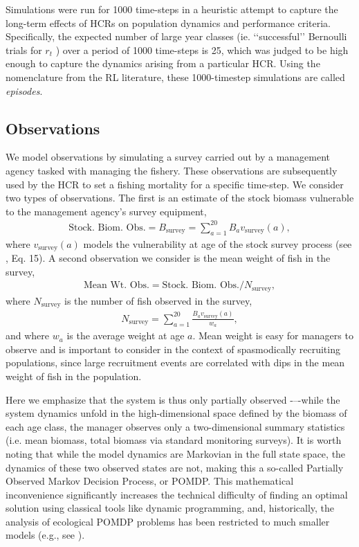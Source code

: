 \documentclass[floatfix,nofootinbib,longbibliography,notitlepage]{revtex4-1}
\def\bsurv{B_{\text{survey}}}
\def\vsurv{v_{\text{survey}}}
\def\nsurv{N_{\text{survey}}}
\begin{document}
Simulations were run for 1000 time-steps in a heuristic attempt to capture the long-term effects of HCRs on population dynamics and performance criteria. 
Specifically, the expected number of large year classes (ie. ‘‘successful’’ Bernoulli trials for $r_t$ ) over a period of 1000 time-steps is 25, which was judged to be high enough to capture the dynamics arising from a particular HCR. 
Using the nomenclature from the RL literature, these 1000-timestep simulations are called \emph{episodes}.

\subsection{Observations}

We model observations by simulating a survey carried out by a management agency tasked with managing the fishery. 
These observations are subsequently used by the HCR to set a fishing mortality for a specific  time-step. 
We consider two types of observations. 
The first is an estimate of the stock biomass vulnerable to the management agency’s survey equipment,
\begin{align}
    \text{Stock. Biom. Obs.} = \bsurv = \sum_{a=1}^{20} B_a \vsurv(a),
\end{align}
where $\vsurv(a)$ models the vulnerability at age of the stock survey process (see \cite{cahill2022}, Eq. 15). 
A second observation we consider is the mean weight of fish in the survey,
\begin{align}
    \text{Mean Wt. Obs.} = \text{Stock. Biom. Obs.} / \nsurv,
\end{align}
where $\nsurv$ is the number of fish observed in the survey,
\begin{align}
    \nsurv = \sum_{a=1}^{20} \frac{B_a \vsurv(a)}{w_a},
\end{align}
and where $w_a$ is the average weight at age $a$.
Mean weight is easy for managers to observe and is important to consider in the context of spasmodically recruiting populations, since large recruitment events are correlated with dips in the mean weight of fish in the population.

Here we emphasize that the system is thus only partially observed \cite{memarzadeh2019}-–-while the system dynamics unfold in the high-dimensional space defined by the biomass of each age class, the manager observes only a two-dimensional summary statistics (i.e. mean biomass, total biomass via standard monitoring surveys). 
It is worth noting that while the model dynamics are Markovian in the full state space, the dynamics of these two observed states are not, making this a so-called Partially Observed Markov Decision Process, or POMDP.  
This mathematical inconvenience significantly increases the technical difficulty  of finding an optimal solution using classical tools like dynamic programming, and, historically, the analysis of ecological POMDP problems has been restricted to much smaller models  (e.g., see \cite{williams2022}).
\end{document}
